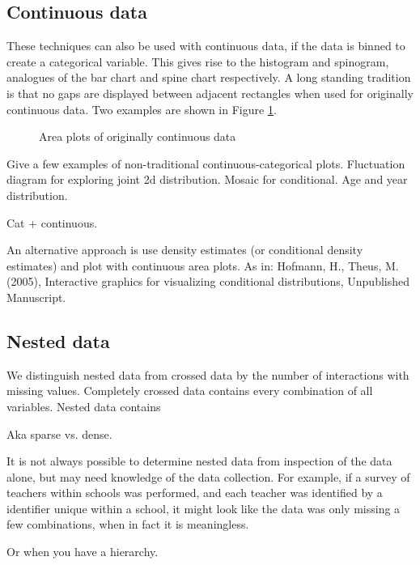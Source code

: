 \documentclass[letterpaper,oneside]{scrartcl}
\begin{document}
\subsection{Continuous data}
\label{sub:continuous_data}

These techniques can also be used with continuous data, if the data is binned to create a categorical variable. This gives rise to the histogram and spinogram, analogues of the bar chart and spine chart respectively. A long standing tradition is that no gaps are displayed between adjacent rectangles when used for originally continuous data. Two examples are shown in Figure \ref{fig:cont-examples}.

\begin{figure}[htbp]
  \begin{center}
  \end{center}
  \caption{Area plots of originally continuous data}
  \label{fig:cont-examples}
\end{figure}

Give a few examples of non-traditional continuous-categorical plots.  Fluctuation diagram for exploring joint 2d distribution.  Mosaic for conditional.  Age and year distribution.  

Cat + continuous.

An alternative approach is use density estimates (or conditional density estimates) and plot with continuous area plots.  As in: Hofmann, H., Theus, M. (2005), Interactive graphics for visualizing conditional distributions, Unpublished Manuscript.

\subsection{Nested data}
\label{sub:nested_data}

We distinguish nested data from crossed data by the number of interactions with missing values.  Completely crossed data contains every combination of all variables.  Nested data contains 

Aka sparse vs. dense.

It is not always possible to determine nested data from inspection of the data alone, but may need knowledge of the data collection.  For example, if a survey of teachers within schools was performed, and each teacher was identified by a identifier unique within a school, it might look like the data was only missing a few combinations, when in fact it is meaningless.  

Or when you have a hierarchy.
\end{document}
